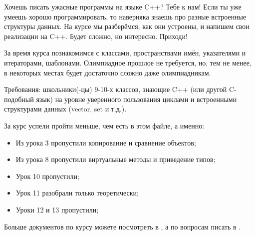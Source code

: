 
Хочешь писать ужасные программы на языке C++? Тебе к нам! Если ты уже умеешь хорошо программировать, то наверняка знаешь про разные встроенные структуры данных. На курсе мы разберёмся, как они устроены, и напишем свои реализации на C++. Будет сложно, но интересно. Приходи!

За время курса познакомимся с классами, пространствами имён, указателями и итераторами, шаблонами. Олимпиадное прошлое не требуется, но, тем не менее, в некоторых местах будет достаточно сложно даже олимпиадникам.

Требования: школьники(-цы) 9-10-х классов, знающие C++ (или другой C-подобный язык) на уровне уверенного пользования циклами и встроенными структурами данных (vector, set и т.д.).


За курс успели пройти меньше, чем есть в этом файле, а именно:
\begin{itemize}
    \item Из урока 3 пропустили копирование и сравнение объектов;
    \item Из урока 8 пропустили виртуальные методы и приведение типов;
    \item Урок 10 пропустили;
    \item Урок 11 разобрали только теоретически;
    \item Уроки 12 и 13 пропустили;
\end{itemize}

Больше документов по курсу можете посмотреть в \href{https://github.com/slavashestakov2005/DataStructuresKLSH}{\color{blue}{репозитории}}, а по вопросам писать в \href{https://vk.com/id517487657}{\color{blue}{vk}}.
